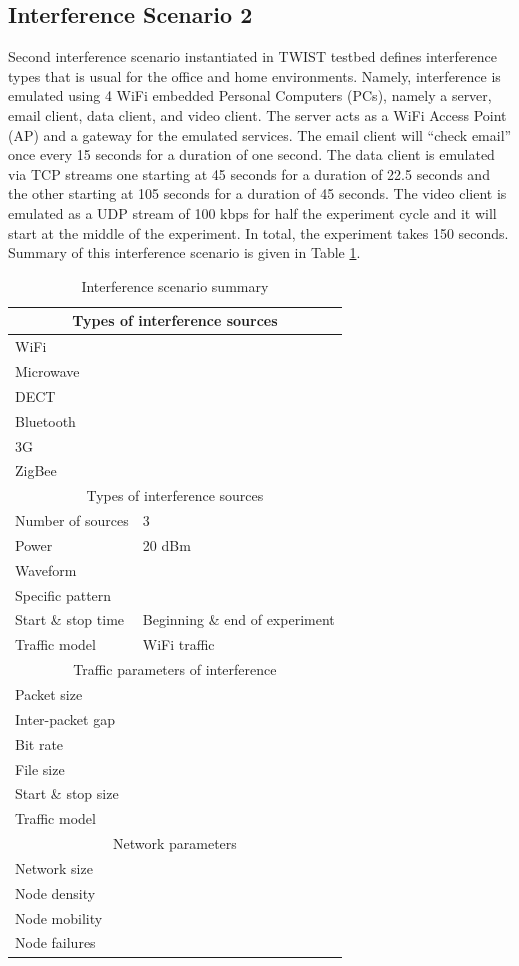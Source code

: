 \documentclass[11pt,a4paper,headinclude,footinclude,chapterprefix=on]{scrreprt}
\begin{document}
\subsection{Interference Scenario 2} Second interference scenario instantiated in TWIST testbed defines interference types that is usual for the office and home environments. Namely, interference is emulated using 4 WiFi embedded Personal Computers (PCs), namely a server, email client, data client, and video client. The server acts as a WiFi Access Point (AP) and a gateway for the emulated services. The email client will “check email” once every 15 seconds for a duration of one second. The data client is emulated via TCP streams one starting at 45 seconds for a duration of 22.5 seconds and the other starting at 105 seconds for a duration of 45 seconds. The video client is emulated as a UDP stream of 100 kbps for half the experiment cycle and it will start at the middle of the experiment. In total, the experiment takes 150 seconds. Summary of this interference scenario is given in Table \ref{tb:interf:3}. 
\begin{table}
	[h] \centering \caption{Interference scenario summary} \label{tb:interf:3} 
	\begin{tabular}
		{|l|l|} \hline \multicolumn{2}{|c|}{Types of interference sources} \\
		\hline WiFi & \checkmark \\
		Microwave & \texttimes \\
		DECT & \texttimes \\
		Bluetooth & \texttimes \\
		3G & \texttimes \\
		ZigBee & \texttimes \\
		\hline \multicolumn{2}{|c|}{Types of interference sources} \\
		\hline Number of sources & 3 \\
		Power & 20 dBm \\
		Waveform & \\
		Specific pattern & \\
		Start \& stop time & Beginning \& end of experiment \\
		Traffic model & WiFi traffic \\
		\hline \multicolumn{2}{|c|}{Traffic parameters of interference} \\
		\hline Packet size & \\
		Inter-packet gap & \\
		Bit rate & \\
		File size & \\
		Start \& stop size & \\
		Traffic model & \\
		\hline \multicolumn{2}{|c|}{Network parameters} \\
		\hline Network size & \\
		Node density & \\
		Node mobility & \\
		Node failures & \\
		\hline 
	\end{tabular}
\end{table}
\end{document}
